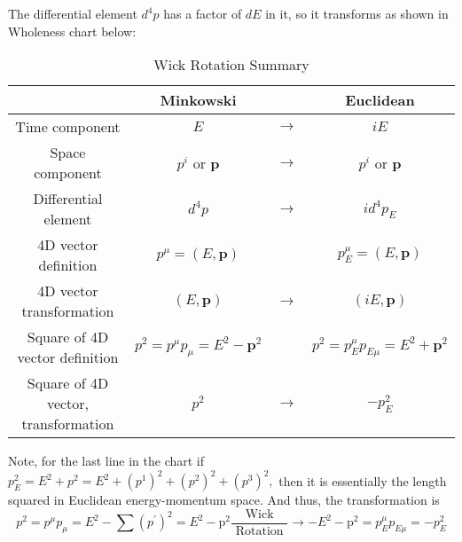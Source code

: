 The differential element $d^4p$ has a factor of $dE$ in it, so it transforms as shown in Wholeness chart below:
\begin{table}[H]
\caption{Wick Rotation Summary}
\label{tab:wick-rotation}
\begin{tabular}{|c|c|c|c|}
\hline
                                    & Minkowski                             &               & Euclidean                                \\ \hline
Time component                      & $E$                                   & $\rightarrow$ & $iE$                                     \\ \hline
Space component                     & $p^i$ or $\mathbf{p}$                 & $\rightarrow$ & $p^i$ or $\mathbf{p}$                    \\ \hline
Differential element                & $d^4p$                                & $\rightarrow$ & $id^4p_E$                                \\ \hline
4D vector definition                & $p^{\mu}=(E,\mathbf{p})$              &               & $p_E^{\mu}=(E,\mathbf{p})$               \\ \hline
4D vector transformation            & $(E,\mathbf{p})$                      & $\rightarrow$ & $(iE,\mathbf{p})$                        \\ \hline
Square of 4D vector definition      & $p^2=p^{\mu}p_{\mu}=E^2-\mathbf{p}^2$ &               & $p^2=p_E^{\mu}p_{E\mu}=E^2+\mathbf{p}^2$ \\ \hline
Square of 4D vector, transformation & $p^2$                                 & $\rightarrow$ & $-p_E^2$                                 \\ \hline
\end{tabular}
\end{table}
Note, for the last line in the chart if $p_{E}^{2}=E^{2}+p^{2}=E^{2}+\left(p^{1}\right)^{2}+\left(p^{2}\right)^{2}+\left(p^{3}\right)^{2},$ then it is essentially the length squared in Euclidean energy-momentum space. And thus, the transformation is
\begin{equation}p^{2}=p^{\mu} p_{\mu}=E^{2}-\sum\left(p^{\prime}\right)^{2}=E^{2}-\mathrm{p}^{2} \frac{\text { Wick }}{\text { Rotation }}\rightarrow-E^{2}-\mathrm{p}^{2}=p_{E}^{\mu} p_{E \mu}=-p_{E}^{2}\end{equation}

